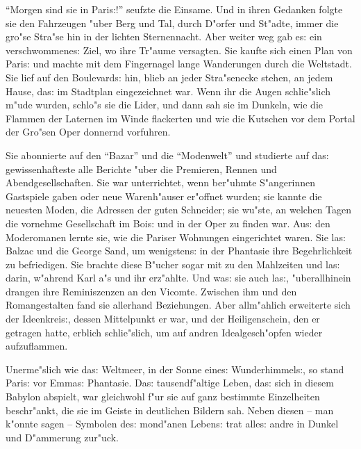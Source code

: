 \documentclass[oneside,12pt]{book}
\newcommand{\s}{s:}%
\begin{document}
"`Morgen sind sie in Pari{\s}!"' seufzte die Einsame. Und in ihren
Gedanken folgte sie den Fahrzeugen "uber Berg und Tal, durch
D"orfer und St"adte, immer die gro"se Stra"se hin in der lichten
Sternennacht. Aber weiter weg gab e{\s} ein verschwommene{\s}
Ziel, wo ihre Tr"aume versagten. Sie kaufte sich einen Plan von
Pari{\s} und machte mit dem Fingernagel lange Wanderungen durch
die Weltstadt. Sie lief auf den Boulevard{\s} hin, blieb an jeder
Stra"senecke stehen, an jedem Hause, da{\s} im Stadtplan
eingezeichnet war. Wenn ihr die Augen schlie"slich m"ude wurden,
schlo"s sie die Lider, und dann sah sie im Dunkeln, wie die
Flammen der Laternen im Winde flackerten und wie die Kutschen vor
dem Portal der Gro"sen Oper donnernd vorfuhren.

Sie abonnierte auf den "`Bazar"' und die "`Modenwelt"' und
studierte auf da{\s} gewissenhafteste alle Berichte "uber die
Premieren, Rennen und Abendgesellschaften. Sie war unterrichtet,
wenn ber"uhmte S"angerinnen Gastspiele gaben oder neue
Warenh"auser er"offnet wurden; sie kannte die neuesten Moden, die
Adressen der guten Schneider; sie wu"ste, an welchen Tagen die
vornehme Gesellschaft im Boi{\s} und in der Oper zu finden war.
Au{\s} den Moderomanen lernte sie, wie die Pariser Wohnungen
eingerichtet waren. Sie la{\s} Balzac und die George Sand, um
wenigsten{\s} in der Phantasie ihre Begehrlichkeit zu befriedigen.
Sie brachte diese B"ucher sogar mit zu den Mahlzeiten und la{\s}
darin, w"ahrend Karl a"s und ihr erz"ahlte. Und wa{\s} sie auch
la{\s}, "uberallhinein drangen ihre Reminis\/zenzen an den
Vicomte. Zwischen ihm und den Romangestalten fand sie allerhand
Beziehungen. Aber allm"ahlich erweiterte sich der Ideenkrei{\s},
dessen Mittelpunkt er war, und der Heiligenschein, den er getragen
hatte, erblich schlie"slich, um auf andren Idealgesch"opfen wieder
aufzuflammen.

Unerme"slich wie da{\s} Weltmeer, in der Sonne eine{\s}
Wunderhimmel{\s}, so stand Pari{\s} vor Emma{\s} Phantasie. Da{\s}
tausendf"altige Leben, da{\s} sich in diesem Babylon abspielt, war
gleichwohl f"ur sie auf ganz bestimmte Einzelheiten beschr"ankt,
die sie im Geiste in deutlichen Bildern sah. Neben diesen -- man
k"onnte sagen -- Symbolen de{\s} mond"anen Leben{\s} trat alle{\s}
andre in Dunkel und D"ammerung zur"uck.
\end{document}
